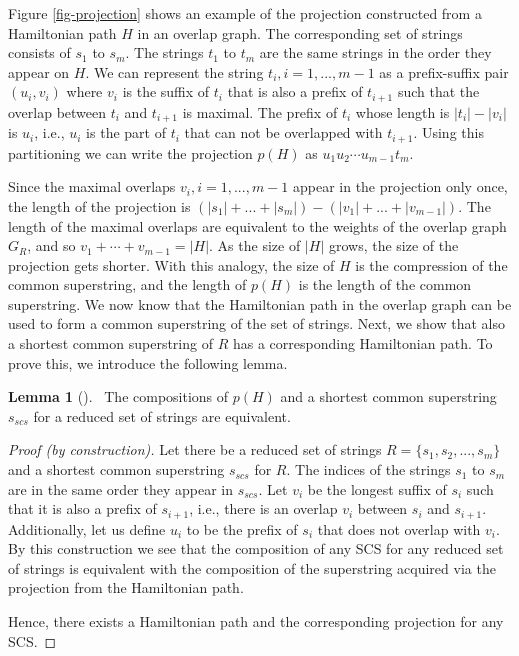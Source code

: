 \documentclass[english,twoside,censored,csm,algorithms-track-2020]{HYthesisML}
\theoremstyle{plain}
\theoremstyle{definition}
\newtheorem{lemma}[theorem]{Lemma}
\begin{document}

Figure \ref{fig-projection} shows an example of the projection constructed from a
Hamiltonian path $H$ in an overlap graph. The corresponding set of
strings consists of $s_1$ to $s_m$.
The strings $t_1$ to $t_m$ are the same strings in the order they appear on $H$.
We can represent the string $t_i, i=1,...,m-1$ as a prefix-suffix pair
$(u_i,v_i)$ where $v_i$ is the suffix of $t_i$ that is also a prefix of $t_{i+1}$ such that the
overlap between $t_i$ and $t_{i+1}$ is maximal. The prefix of $t_i$ whose length is $|t_i|-|v_i|$ is
$u_i$, i.e., $u_i$ is the part of $t_i$ that can not be overlapped with $t_{i+1}$. Using this
partitioning we can write the projection $p(H)$ as $u_1u_2\cdots u_{m-1}t_m$.

Since the maximal overlaps $v_i,i=1,...,m-1$ appear in the projection only once, the length of the
projection is $(|s_1|+...+|s_m|) - (|v_1|+...+|v_{m-1}|)$. The length of the maximal overlaps
are equivalent to the weights of the overlap graph $G_R$, and so $v_1+\cdots +v_{m-1} = |H|$. As the size
of $|H|$ grows, the size of the projection gets shorter.
With this analogy, the size of $H$ is the compression of the common superstring,
and the length of $p(H)$ is the length of the common superstring.
We now know that the Hamiltonian path in the overlap graph can be used to form a common superstring
of the set of strings. Next, we show that also a shortest common superstring of $R$ has a
corresponding Hamiltonian path. To prove this, we introduce the following lemma.


\begin{lemma}[]~\label{lem-composition}
The compositions of $p(H)$ and a shortest common superstring $s_{scs}$ for a reduced set of strings are equivalent.
\end{lemma}
\begin{proof}[Proof (by construction)]
  Let there be a reduced set of strings $R=\{s_1,s_2,...,s_m\}$ and
  a shortest common superstring $s_{scs}$ for $R$. The indices of the strings $s_1$ to $s_m$ are in the same
  order they appear in $s_{scs}$. Let $v_i$ be the longest suffix of $s_i$ such that it is also a prefix
  of $s_{i+1}$, i.e., there is an overlap $v_i$ between $s_i$ and $s_{i+1}$. Additionally, let us
  define $u_i$ to be the prefix of $s_i$ that does not overlap with $v_i$. By this construction we
  see that the composition of any SCS for any reduced set of strings is equivalent with the composition
  of the superstring acquired via the projection from the Hamiltonian path.

  Hence, there exists a Hamiltonian path and the corresponding projection for any SCS.

\end{proof}
\end{document}
